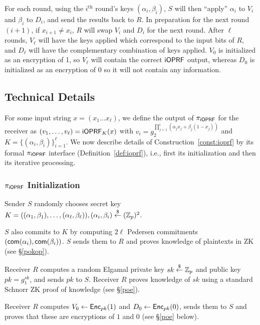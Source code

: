 For each round, using the $i^{\text{th}}$ round's keys $(\alpha_i,\beta_i)$, $S$
will then ``apply'' $\alpha_i$ to $V_i$ and $\beta_i$ to $D_i$, and send the
results back to $R$. In preparation for the next round $(i+1)$, if $x_{i+1}\neq
x_{i}$, $R$ will swap $V_i$ and $D_i$ for the next round.  After $\ell$ rounds,
$V_\ell$ will have the keys applied which correspond to the input bits of $R$, and
$D_\ell$ will have the complementary combination of keys applied.  $V_0$ is initialized
as an encryption of 1, so $V_\ell$ will contain the correct $\mathsf{i}\mathsf{OPRF}$ output, whereas
$D_0$ is initialized as an encryption of 0 so it will not contain any information.

\subsection{Technical Details}
For some input string $x=(x_1\ldots{}x_\ell)$, we define the output of
${\pi_{\mathsf{i}\mathsf{OPRF}}}$ for the receiver as $(v_1,\ldots,v_\ell)=\mathsf{i}\mathsf{OPRF}_{K}(x)$ with
$v_i=g_2^{\prod_{j=1}^{i}(\alpha_j{}x_j+\beta_j(1-x_j))}$ and $K=\{(\alpha_i,\beta_i)\}^\ell_{i=1}$. 
We now describe details of Construction~\ref{const:ioprf} by its formal
${\pi_{\mathsf{i}\mathsf{OPRF}}}$ interface (Definition~\ref{def:ioprf}), i.e., first its
initialization and then its iterative processing.

\subsubsection{${\pi_{\mathsf{i}\mathsf{OPRF}}}$ Initialization}
Sender $S$ randomly chooses secret key
$K=((\alpha_1,\beta_1),\ldots,(\alpha_\ell,\beta_\ell)),
(\alpha_i,\beta_i)\stackrel{\$}{\leftarrow}(\mathbb{Z}_p)^2$.

$S$ also commits to $K$ by computing $2\ell$ Pedersen commitments
  $(\mathsf{com}(\alpha_i),\mathsf{com}(\beta_i))$. $S$ sends them to $R$ and
  proves knowledge of plaintexts in ZK (see \S\ref{pokop}).

Receiver $R$ computes a random
Elgamal private key $sk\stackrel{\$}{\leftarrow}\mathbb{Z}_p$ and public key $pk=g_1^{sk}$, and
sends $pk$ to $S$. Receiver $R$ proves knowledge of $sk$ using
a standard Schnorr ZK proof of knowledge (see \S\ref{poe}).


Receiver $R$ computes $V_0 \leftarrow{\mathsf{Enc}}_{pk}(1)$ and
$D_0\leftarrow{\mathsf{Enc}}_{pk}(0)$, sends them to $S$ and proves that
these are encryptions of $1$ and $0$ (see \S\ref{poe} below). 


